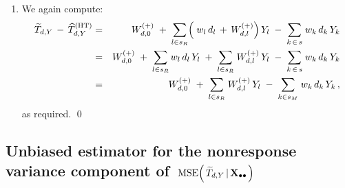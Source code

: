\begin{enumerate}
\begin{eqnarray*}
                \overset{J}{\underset{j=1}{\sum}}\;
                \underset{k \in s_{M}^{(j)}}{\sum}\,w_{k}\,d_{k}\,\varphi^{(j)}_{lk}
                \right)
            \right)
        Y_{l}
    \\
    & \overset{{\color{white}\textnormal{\LARGE$1$}}}{=} &
        W^{(+)}_{d,0}
        \;+\;
        \underset{l \in s_{R}}{\sum}\left(\,w_{l}d_{l} \,+\, W^{(+)}_{d,l}\,\right)Y_{l}
    \end{eqnarray*}
\item
    We again compute:
    \begin{eqnarray*}
    \widetilde{T}_{d,Y}
    \,-\,
    \widehat{T}^{\textnormal{(HT)}}_{d,Y}
    & = &
        W^{(+)}_{d,0}
        \;+\;
        \underset{l \in s_{R}}{\sum}\!
        \left(\;
            w_{l}\,d_{l}
            \,+\,
            W^{(+)}_{d,l}
            \right)
        Y_{l}
        \;-\;
        \underset{k\,\in\,s}{\sum}\;w_{k}\,d_{k}\,Y_{k}
    \\
    & = &
        W^{(+)}_{d,0}
        \;+\;
        \underset{l \in s_{R}}{\sum}\,w_{l}\,d_{l}\,Y_{l}
        \;+\;
        \underset{l \in s_{R}}{\sum}\;W^{(+)}_{d,l}\,Y_{l}
        \;-\;
        \underset{k\,\in\,s}{\sum}\;w_{k}\,d_{k}\,Y_{k}
    \\
    & = &
        W^{(+)}_{d,0}
        \;+\;
        \underset{l \in s_{R}}{\sum}\;W^{(+)}_{d,l}\,Y_{l}
        \;-\;
        \underset{k \in s_{M}}{\sum}\;w_{k}\,d_{k}\,Y_{k}\,,
    \end{eqnarray*}
    as required.
    \qed
\end{enumerate}


\vskip 1.0cm
\subsection{Unbiased estimator for the nonresponse variance component of
\,$\textnormal{MSE}\!\left(\,\widetilde{T}_{d,Y}\left\vert\,\mathbf{X}_{\bullet\bullet}\right.\right)$}
\setcounter{theorem}{0}


